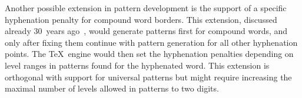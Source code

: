 \documentclass{csbulletin}
\begin{document}

Another possible extension in pattern development is the support of a specific hyphenation penalty for compound word borders.
This extension, discussed already 30~years ago~\cite{tex:sojka95b}, would generate patterns first for compound words, and only after fixing them continue with pattern generation for all other hyphenation points.
The \TeX\ engine would then set the hyphenation penalties depending on level ranges in patterns found for the hyphenated word.
This extension is orthogonal with support for universal patterns but might require increasing the maximal number of levels allowed in patterns to two digits. 
\end{document}
